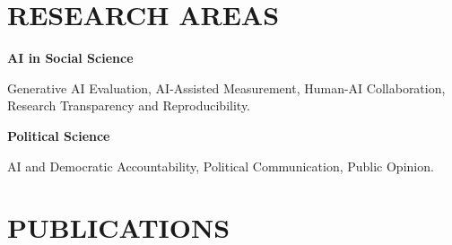 \documentclass[10.5pt,]{article}
\providecommand{\tightlist}{%
	\setlength{\itemsep}{0pt}\setlength{\parskip}{0pt}}
\renewenvironment{itemize}{
	\begin{list}{}{
			\setlength{\leftmargin}{1.5em}
		}
	}{
	\end{list}
}
\begin{document}
\section{RESEARCH AREAS}\label{research-areas}

\begin{itemize}
\tightlist
\item
  \textbf{AI in Social Science}

  \begin{itemize}
  \tightlist
  \item
    Generative AI Evaluation, AI-Assisted Measurement, Human-AI
    Collaboration, Research Transparency and Reproducibility.
  \end{itemize}
\item
  \textbf{Political Science}

  \begin{itemize}
  \tightlist
  \item
    AI and Democratic Accountability, Political Communication, Public
    Opinion.
  \end{itemize}
\end{itemize}

\section{PUBLICATIONS}\label{publications}
\end{document}
